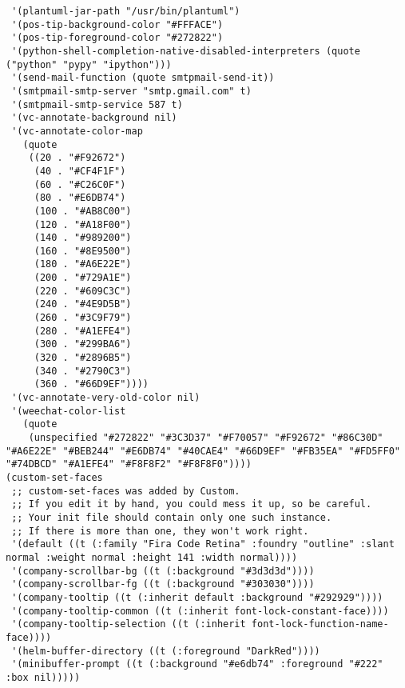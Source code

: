 \documentclass[11pt]{article}
\begin{document}
\begin{verbatim}
 '(plantuml-jar-path "/usr/bin/plantuml")
 '(pos-tip-background-color "#FFFACE")
 '(pos-tip-foreground-color "#272822")
 '(python-shell-completion-native-disabled-interpreters (quote ("python" "pypy" "ipython")))
 '(send-mail-function (quote smtpmail-send-it))
 '(smtpmail-smtp-server "smtp.gmail.com" t)
 '(smtpmail-smtp-service 587 t)
 '(vc-annotate-background nil)
 '(vc-annotate-color-map
   (quote
    ((20 . "#F92672")
     (40 . "#CF4F1F")
     (60 . "#C26C0F")
     (80 . "#E6DB74")
     (100 . "#AB8C00")
     (120 . "#A18F00")
     (140 . "#989200")
     (160 . "#8E9500")
     (180 . "#A6E22E")
     (200 . "#729A1E")
     (220 . "#609C3C")
     (240 . "#4E9D5B")
     (260 . "#3C9F79")
     (280 . "#A1EFE4")
     (300 . "#299BA6")
     (320 . "#2896B5")
     (340 . "#2790C3")
     (360 . "#66D9EF"))))
 '(vc-annotate-very-old-color nil)
 '(weechat-color-list
   (quote
    (unspecified "#272822" "#3C3D37" "#F70057" "#F92672" "#86C30D" "#A6E22E" "#BEB244" "#E6DB74" "#40CAE4" "#66D9EF" "#FB35EA" "#FD5FF0" "#74DBCD" "#A1EFE4" "#F8F8F2" "#F8F8F0"))))
(custom-set-faces
 ;; custom-set-faces was added by Custom.
 ;; If you edit it by hand, you could mess it up, so be careful.
 ;; Your init file should contain only one such instance.
 ;; If there is more than one, they won't work right.
 '(default ((t (:family "Fira Code Retina" :foundry "outline" :slant normal :weight normal :height 141 :width normal))))
 '(company-scrollbar-bg ((t (:background "#3d3d3d"))))
 '(company-scrollbar-fg ((t (:background "#303030"))))
 '(company-tooltip ((t (:inherit default :background "#292929"))))
 '(company-tooltip-common ((t (:inherit font-lock-constant-face))))
 '(company-tooltip-selection ((t (:inherit font-lock-function-name-face))))
 '(helm-buffer-directory ((t (:foreground "DarkRed"))))
 '(minibuffer-prompt ((t (:background "#e6db74" :foreground "#222" :box nil)))))
\end{verbatim}
\end{document}
